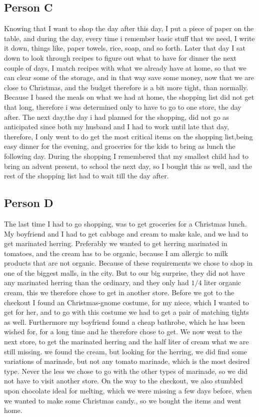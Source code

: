 \subsection{Person C}
Knowing that I want to shop the day after this day, I put a piece of paper on the table, and during the day, every time i remember basic stuff that we need, I write it down, things like, paper towels, rice, soap, and so forth. Later that day I sat down to look through recipes to figure out what to have for dinner the next couple of days, I match recipes with what we already have at home, so that we can clear some of the storage, and in that way save some money, now that we are close to Christmas, and the budget therefore is a bit more tight, than normally. Because I based the meals on what we had at home, the shopping list did not get that long, therefore i was determined only to have to go to one store, the day after. The next day,the day i had planned for the shopping, did not go as anticipated since both my husband and I had to work until late that day, therefore, I only went to do get the most critical items on the shopping list,being easy dinner for the evening, and groceries for the kids to bring as lunch the following day. During the shopping I remembered that my smallest child had to bring an advent present, to school the next day, so I bought this as well, and the rest of the shopping list had to wait till the day after.

\subsection{Person D}
The last time I had to go shopping, was to get groceries for a Christmas lunch. My boyfriend and I had to get cabbage and cream to make kale, and we had to get marinated herring. Preferably we wanted to get herring marinated in tomatoes, and the cream has to be organic, because I am allergic to milk products that are not organic. Because of these requirements we chose to shop in one of the biggest malls, in the city. But to our big surprise, they did not have any marinated herring than the ordinary, and they only had $1/4$ liter organic cream, this we therefore chose to get in another store. Before we got to the checkout I found an Christmas-gnome costume, for my niece, which I wanted to get for her, and to go with this costume we had to get a pair of matching tights as well. Furthermore my boyfriend found a cheap bathrobe, which he has been wished for, for a long time and he therefore chose to get. We now went to the next store, to get the marinated herring and the half liter of cream what we are still missing. we found the cream, but looking for the herring, we did find some variations of marinade, but not any tomato marinade, which is the most desired type. Never the less we chose to go with the other types of marinade, so we did not have to visit another store. On the way to the checkout, we also stumbled upon chocolate ideal for melting, which we were missing a few days before, when we wanted to make some Christmas candy., so we bought the items and went home.

